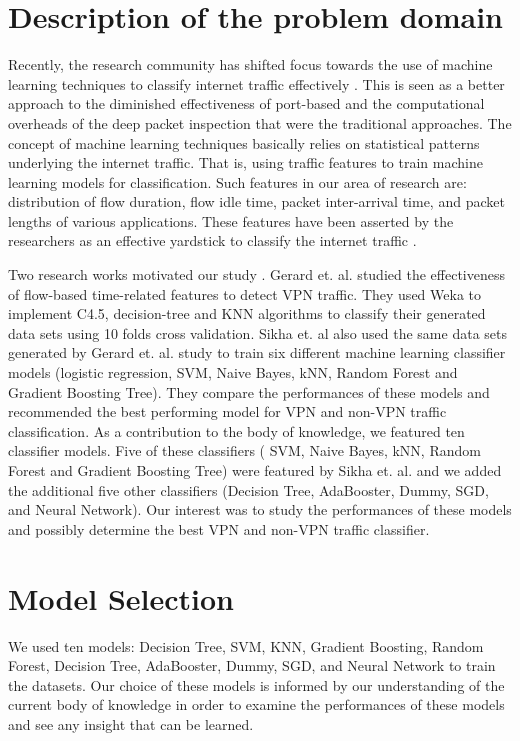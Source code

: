 \documentclass[conference]{IEEEtran}
\begin{document}



\section{Description of the problem domain}
Recently, the research community has shifted focus towards the use of machine learning techniques to classify internet traffic effectively \cite{b2,b3,b4,b6}. This is seen as a better approach to the diminished effectiveness of port-based and the computational overheads of the deep packet inspection that were the traditional approaches\cite{b6}. The concept of machine learning techniques basically relies on statistical patterns underlying the internet traffic. That is, using traffic features to train machine learning models for classification. Such features in our area of research are: distribution of flow duration, flow idle time, packet inter-arrival time, and packet lengths of various applications. These features have been asserted by the researchers as an effective yardstick to classify the internet traffic \cite{b3,b1,b7}.

Two research works motivated our study \cite{b1,b7}.  Gerard et. al. studied the effectiveness of flow-based time-related features to detect VPN traffic. They used Weka to implement C4.5, decision-tree and KNN algorithms to classify their generated data sets using 10 folds cross validation. Sikha et. al also used the same data sets generated by Gerard et. al. study to train six different machine learning classifier models (logistic regression, SVM, Naive Bayes, kNN, Random Forest and Gradient Boosting Tree). They compare the performances of these models and recommended the best performing model for VPN and non-VPN traffic classification. As a contribution to the body of knowledge, we featured ten classifier models. Five of these classifiers ( SVM, Naive Bayes, kNN, Random Forest and Gradient Boosting Tree) were featured by Sikha et. al. and we added the additional five other classifiers (Decision Tree, AdaBooster, Dummy, SGD, and Neural Network).  Our interest was to study the performances of these models and possibly determine the best VPN and non-VPN traffic classifier.

\section{Model Selection}
We used ten models: Decision Tree, SVM, KNN, Gradient Boosting, Random Forest, Decision Tree, AdaBooster, Dummy, SGD, and Neural Network to train the datasets. Our choice of these models is informed by our understanding of the current body of knowledge in order to examine the performances of these models and see any insight that can be learned.
\end{document}
